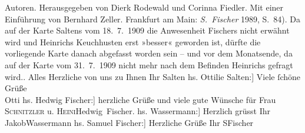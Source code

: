 \begin{ledgroupsized}[t]{13cm}
{{{{                              Autoren}. Herausgegeben von Dierk Rodewald und Corinna Fiedler. Mit
                           einer Einführung von Bernhard Zeller. Frankfurt am Main:
                           \emph{S. Fischer}{ }1989, S. 84). Da auf der Karte Saltens vom 18. 7. 1909 die Anwesenheit Fischers nicht erwähnt wird und Heinrichs Keuchhusten erst »besser« geworden ist, dürfte die vorliegende Karte
                  danach abgefasst worden sein – und vor dem Monatsende, da auf der Karte vom 31. 7. 1909 nicht mehr nach
                  dem Befinden Heinrichs gefragt
               wird.}}}\label{K_L03504-1h}. Alles Herzliche von uns zu Ihnen\pend
           \pstart Ihr \spacefill\mbox{Salten}\pend{}\pstart
           \noindent{}{[}hs. Ottilie Salten:{]} Viele ſchöne Grüße {\\}\spacefill\mbox{Otti}\pend
           \pstart
           \noindent{}{[}hs. Hedwig Fischer:{]} herzliche Grüße und viele gute Wünsche für Frau \textsc{Schnitzler} u. \textsc{Heini}\spacefill\mbox{Hedwig Fischer.}\pend
           \pstart
           \noindent{}{[}hs. Wassermann:{]} Herzlich grüsst Ihr \spacefill\mbox{JakobWassermann}\pend
           \pstart
           \noindent{}{[}hs. Samuel Fischer:{]} Herzliche Grüße Ihr \spacefill\mbox{SFischer}\pend
           
         
         \endnumbering{}\end{ledgroupsized}  \newcommand{\dateiname}{L03504}\newcommand{\titel}{Felix Salten u. a. an Arthur Schnitzler, [zwischen 19. und 30. 7.? 1909]}\newcommand{\editorInnen}{Martin Anton Müller und Laura Untner}
      